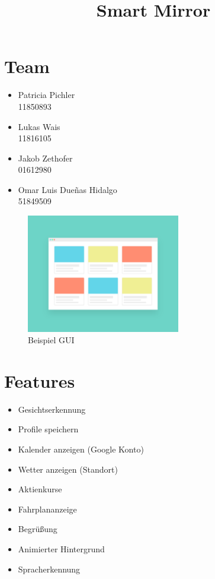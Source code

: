 \documentclass[12pt, A4]{article}
\title{ Smart Mirror}
\begin{document}
\maketitle

\section{Team}
\begin{center}
\begin{multicols}{2}
\begin{itemize}
	\item[]Patricia Pichler \\ 11850893 
	\item[]Lukas Wais \\ 11816105
	\item[]Jakob Zethofer \\ 01612980
	\item[]Omar Luis Due\~nas Hidalgo \\ 51849509
\end{itemize}
\end{multicols}	
\end{center}

\begin{figure}[h]
\centering
	\includegraphics[width=0.6\textwidth]{gui.png}
	\caption{Beispiel GUI \cite{pixabay}}
\end{figure}

\newpage

\section{Features}
\begin{itemize}
	\item Gesichtserkennung
	\item Profile speichern
	\item Kalender anzeigen (Google Konto)
	\item Wetter anzeigen (Standort)
	\item Aktienkurse
	\item Fahrplananzeige
	\item Begrüßung
	\item Animierter Hintergrund
	\item Spracherkennung
\end{itemize}
\end{document}
